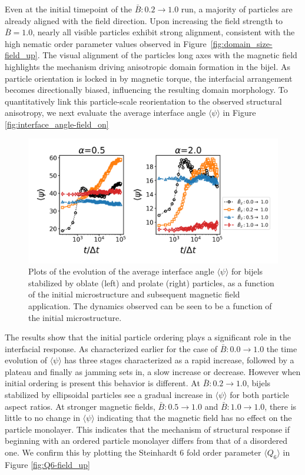 Even at the initial timepoint of the \(\bar{B}: 0.2 \rightarrow 1.0\) run, a majority of particles are already aligned with the field direction. 
Upon increasing the field strength to \(\bar{B} = 1.0\), nearly all visible particles exhibit strong alignment, consistent with the high nematic order 
parameter values observed in Figure~\ref{fig:domain_size-field_up}.
The visual alignment of the particles long axes with the magnetic field highlights the mechanism driving anisotropic domain formation in the bijel. 
As particle orientation is locked in by magnetic torque, the interfacial arrangement becomes directionally biased, influencing the resulting domain 
morphology. To quantitatively link this particle-scale reorientation to the observed structural anisotropy, we next evaluate the average interface 
angle \(\langle \psi \rangle\) in Figure \ref{fig:interface_angle-field_on}

\begin{figure} 
    \centering 
    \includegraphics[scale=0.6]{../figures/results/paper2/psi-field_up.png} 
    \caption{Plots of the evolution of the average interface angle \(\langle \psi \rangle\) for bijels stabilized 
             by oblate (left) and prolate (right) particles, as a function of the initial microstructure and subsequent magnetic field application.
             The dynamics observed can be seen to be a function of the initial microstructure.} 
    \label{fig:interface_angle-field_up} 
\end{figure}

The results show that the initial particle ordering plays a significant role in the interfacial response. As characterized earlier for the case of
$\bar{B}:0.0 \rightarrow 1.0$ the time evolution of $\langle \psi \rangle$ has three stages characterized as a rapid increase, followed by a plateau
and finally as jamming sets in, a slow increase or decrease. However when initial ordering is present this behavior is different. At 
$\bar{B}: 0.2 \rightarrow 1.0$, bijels stabilized by ellipsoidal particles see a gradual increase in $\langle \psi \rangle$ for both particle aspect ratios.
At stronger magnetic fields, $\bar{B}: 0.5 \rightarrow 1.0$ and $\bar{B}: 1.0 \rightarrow 1.0$, there is little to no change in $\langle \psi \rangle$ indicating
that the magnetic field has no effect on the particle monolayer. This indicates that the mechanism of structural response if beginning with an ordered particle
monolayer differs from that of a disordered one. We confirm this by plotting the Steinhardt 6 fold order parameter $\langle Q_6 \rangle$ in Figure \ref{fig:Q6-field_up}

